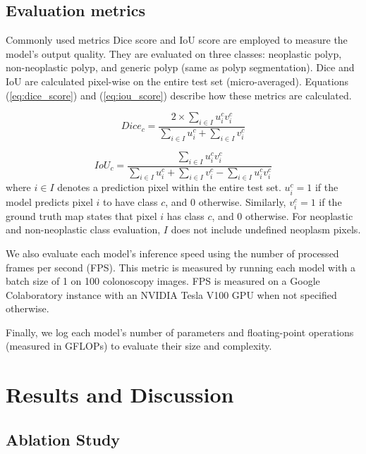 \documentclass{ieeeaccess}
\begin{document}
\subsection{Evaluation metrics}
Commonly used metrics Dice score and IoU score are employed to measure the model's output quality. They are evaluated on three classes: neoplastic polyp, non-neoplastic polyp, and generic polyp (same as polyp segmentation). Dice and IoU are calculated pixel-wise on the entire test set (micro-averaged). Equations (\ref{eq:dice_score}) and (\ref{eq:iou_score}) describe how these metrics are calculated.

\begin{equation}
    \label{eq:dice_score}
    Dice_{c} = \frac{ 2\times \sum_{i\in{I}}^{} u_{i}^{c} v_{i}^{c} }{ \sum_{i\in{I}}^{} u_{i}^{c} + \sum_{i\in{I}}^{} v_{i}^{c}}
\end{equation}

\begin{equation}
    \label{eq:iou_score}
    IoU_{c} = \frac{ \sum_{i\in{I}}^{} u_{i}^{c} v_{i}^{c} }{ \sum_{i\in{I}}^{} u_{i}^{c} + \sum_{i\in{I}}^{} v_{i}^{c} - \sum_{i\in{I}}^{} u_{i}^{c} v_{i}^{c} }
\end{equation}
where $i \in I$ denotes a prediction pixel within the entire test set. $u_{i}^{c} = 1$ if the model predicts pixel $i$ to have class $c$, and $0$ otherwise. Similarly, $v_{i}^{c} = 1$ if the ground truth map states that pixel $i$ has class $c$, and $0$ otherwise. For neoplastic and non-neoplastic class evaluation, $I$ does not include undefined neoplasm pixels.

We also evaluate each model's inference speed using the number of processed frames per second (FPS). This metric is measured by running each model with a batch size of 1 on 100 colonoscopy images. FPS is measured on a Google Colaboratory instance with an NVIDIA Tesla V100 GPU when not specified otherwise.

Finally, we log each model's number of parameters and floating-point operations (measured in GFLOPs) to evaluate their size and complexity.

\section{Results and Discussion}
\subsection{Ablation Study}
\end{document}

